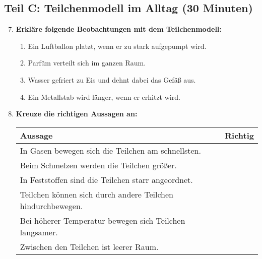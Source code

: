 \subsection*{Teil C: Teilchenmodell im Alltag (30 Minuten)}

\begin{enumerate}[label=\arabic*.]
    \setcounter{enumi}{6}

    \item \textbf{Erkläre folgende Beobachtungen mit dem Teilchenmodell:}
    \vspace{0.5cm}

    \begin{enumerate}[label=\alph*)]
        \item Ein Luftballon platzt, wenn er zu stark aufgepumpt wird.
        \vspace{2cm}

        \item Parfüm verteilt sich im ganzen Raum.
        \vspace{2cm}

        \item Wasser gefriert zu Eis und dehnt dabei das Gefäß aus.
        \vspace{2cm}

        \item Ein Metallstab wird länger, wenn er erhitzt wird.
        \vspace{2cm}
    \end{enumerate}

    \vspace{1cm}

    \item \textbf{Kreuze die richtigen Aussagen an:}
    \vspace{0.5cm}

    \begin{tabularx}{\textwidth}{|l|c|}
        \hline
        \textbf{Aussage} & \textbf{Richtig} \\
        \hline
        In Gasen bewegen sich die Teilchen am schnellsten. & \\
        \hline
        Beim Schmelzen werden die Teilchen größer. & \\
        \hline
        In Feststoffen sind die Teilchen starr angeordnet. & \\
        \hline
        Teilchen können sich durch andere Teilchen hindurchbewegen. & \\
        \hline
        Bei höherer Temperatur bewegen sich Teilchen langsamer. & \\
        \hline
        Zwischen den Teilchen ist leerer Raum. & \\
        \hline
    \end{tabularx}

\end{enumerate}